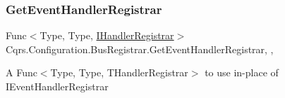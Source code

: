 \subsubsection{\texorpdfstring{Get\+Event\+Handler\+Registrar}{GetEventHandlerRegistrar}}
{\footnotesize\ttfamily Func$<$Type, Type, \hyperlink{interfaceCqrs_1_1Bus_1_1IHandlerRegistrar}{I\+Handler\+Registrar}$>$ Cqrs.\+Configuration.\+Bus\+Registrar.\+Get\+Event\+Handler\+Registrar\hspace{0.3cm}{\ttfamily [static]}, {\ttfamily [get]}, {\ttfamily [set]}}



A Func$<$\+Type, Type, T\+Handler\+Registrar$>$ to use in-\/place of I\+Event\+Handler\+Registrar 

